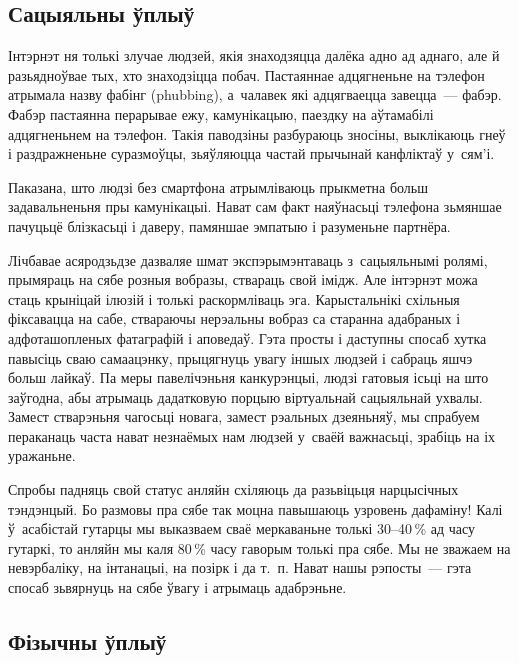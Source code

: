 \subsection*{Сацыяльны ўплыў}

Інтэрнэт ня толькі злучае людзей, якія знаходзяцца далёка адно ад аднаго, але й разьядноўвае тых, хто знаходзіцца побач. Пастаяннае адцягненьне на тэлефон атрымала назву фабінг (phubbing), а~чалавек які адцягваецца завецца~--- фабэр. Фабэр пастаянна перарывае ежу, камунікацыю, паездку на аўтамабілі адцягненьнем на тэлефон. Такія паводзіны разбураюць зносіны, выклікаюць гнеў і раздражненьне суразмоўцы, зьяўляюцца частай прычынай канфліктаў у~сям'і.

Паказана, што людзі без смартфона атрымліваюць прыкметна больш задавальненьня пры камунікацыі. Нават сам факт наяўнасьці тэлефона зьмяншае пачуцьцё блізкасьці і даверу, памяншае эмпатыю і разуменьне партнёра.


Лічбавае асяродзьдзе дазваляе шмат экспэрымэнтаваць з~сацыяльнымі ролямі, прымяраць на сябе розныя вобразы, ствараць свой імідж. Але інтэрнэт можа стаць крыніцай ілюзій і толькі раскормліваць эга. Карыстальнікі схільныя фіксавацца на сабе, ствараючы нерэальны вобраз са старанна адабраных і адфоташопленых фатаграфій і аповедаў. Гэта просты і даступны спосаб хутка павысіць сваю самаацэнку, прыцягнуць увагу іншых людзей і сабраць яшчэ больш лайкаў. Па меры павелічэньня канкурэнцыі, людзі гатовыя ісьці на што заўгодна, абы атрымаць дадатковую порцыю віртуальнай сацыяльнай ухвалы. Замест стварэньня чагосьці новага, замест рэальных дзеяньняў, мы спрабуем пераканаць часта нават незнаёмых нам людзей у~сваёй важнасьці, зрабіць на іх уражаньне.

Спробы падняць свой статус анляйн схіляюць да разьвіцьця нарцысічных тэндэнцый. Бо размовы пра сябе так моцна павышаюць узровень дафаміну! Калі ў~асабістай гутарцы мы выказваем сваё меркаваньне толькі 30--40\,\% ад часу гутаркі, то анляйн мы каля 80\,\% часу гаворым толькі пра сябе. Мы не зважаем на невэрбаліку, на інтанацыі, на позірк і да т.~п. Нават нашы рэпосты~--- гэта спосаб зьвярнуць на сябе ўвагу і атрымаць адабрэньне.

\subsection*{Фізычны ўплыў}

